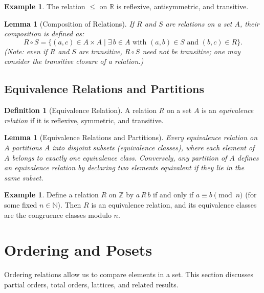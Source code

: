 \documentclass[12pt]{article}
\newtheorem{lemma}[theorem]{Lemma}
\theoremstyle{definition}
\newtheorem{definition}[theorem]{Definition}
\newtheorem{example}[theorem]{Example}
\begin{document}
\begin{example}
  The relation \( \leq \) on \(\mathbb{R}\) is reflexive, antisymmetric, and transitive.
\end{example}

\begin{lemma}[Composition of Relations]
  If \(R\) and \(S\) are relations on a set \(A\), their composition is defined as:
  \[
  R \circ S = \{ (a,c) \in A \times A \mid \exists\, b \in A \text{ with } (a,b) \in S \text{ and } (b,c) \in R \}.
  \]
  (Note: even if \(R\) and \(S\) are transitive, \(R \circ S\) need not be transitive; one may consider the \emph{transitive closure} of a relation.)
\end{lemma}

\subsection{Equivalence Relations and Partitions}

\begin{definition}[Equivalence Relation]
  A relation \(R\) on a set \(A\) is an \emph{equivalence relation} if it is reflexive, symmetric, and transitive.
\end{definition}

\begin{lemma}[Equivalence Relations and Partitions]
  Every equivalence relation on \(A\) partitions \(A\) into disjoint subsets (equivalence classes), where each element of \(A\) belongs to exactly one equivalence class. Conversely, any partition of \(A\) defines an equivalence relation by declaring two elements equivalent if they lie in the same subset.
\end{lemma}

\begin{example}
  Define a relation \(R\) on \(\mathbb{Z}\) by \(a\,R\,b\) if and only if \(a \equiv b \pmod{n}\) (for some fixed \(n\in\mathbb{N}\)). Then \(R\) is an equivalence relation, and its equivalence classes are the congruence classes modulo \(n\).
\end{example}

\section{Ordering and Posets}

Ordering relations allow us to compare elements in a set. This section discusses partial orders, total orders, lattices, and related results.
\end{document}
